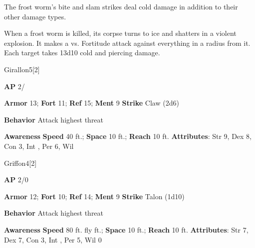 The frost worm's bite and slam strikes deal cold damage in addition to their other damage types.

\vspace{0.5em}
When a frost worm is killed, its corpse turns to ice and shatters in a violent explosion.
It makes a  vs. Fortitude attack against everything in a \areahuge radius from it.
\hit Each target takes 13d10 cold and piercing damage.

\begin{monsection}{Girallon}{5}[2]
\vspace{-1em}\vspace{-1em}
\begin{spellcontent}
\begin{spelltargetinginfo}
{\textbf{AP} 2/}

\pari \textbf{Armor} 13;
\textbf{Fort} 11;
\textbf{Ref} 15;
\textbf{Ment} 9
\pari \textbf{Strike} Claw  (2d6)



\pari \textbf{Behavior} Attack highest threat
\end{spelltargetinginfo}
\end{spellcontent}

\begin{monsterfooter}
\pari \textbf{Awareness} 
\pari \textbf{Speed} 40 ft.;
\textbf{Space} 10 ft.;
\textbf{Reach} 10 ft.
\pari \textbf{Attributes}:
Str 9,
Dex 8,
Con 3,
Int ,
Per 6,
Wil 
\end{monsterfooter}
\end{monsection}

\begin{monsection}{Griffon}{4}[2]
\vspace{-1em}\vspace{-1em}
\begin{spellcontent}
\begin{spelltargetinginfo}
{\textbf{AP} 2/0}

\pari \textbf{Armor} 12;
\textbf{Fort} 10;
\textbf{Ref} 14;
\textbf{Ment} 9
\pari \textbf{Strike} Talon  (1d10)



\pari \textbf{Behavior} Attack highest threat
\end{spelltargetinginfo}
\end{spellcontent}

\begin{monsterfooter}
\pari \textbf{Awareness} 
\pari \textbf{Speed} 80 ft. fly ft.;
\textbf{Space} 10 ft.;
\textbf{Reach} 10 ft.
\pari \textbf{Attributes}:
Str 7,
Dex 7,
Con 3,
Int ,
Per 5,
Wil 0
\end{monsterfooter}
\end{monsection}


